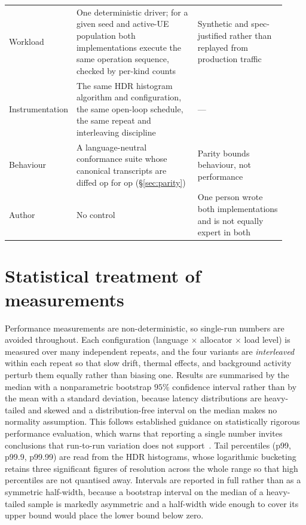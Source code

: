 \documentclass[english,twoside,openright,a4paper,censored,csm,software-track-2020]{HYthesisML}
\begin{document}
\begin{table}
\begin{tabular}{@{}R{0.16\linewidth} R{0.44\linewidth} R{0.32\linewidth}@{}}
Workload & One deterministic driver; for a given seed and active-UE population both implementations execute the same operation sequence, checked by per-kind counts & Synthetic and spec-justified rather than replayed from production traffic \\
Instrumentation & The same HDR histogram algorithm and configuration, the same open-loop schedule, the same repeat and interleaving discipline & --- \\
Behaviour & A language-neutral conformance suite whose canonical transcripts are diffed op for op (\S\ref{sec:parity}) & Parity bounds behaviour, not performance \\
\hline
Author & No control & One person wrote both implementations and is not equally expert in both \\
\hline
\end{tabular}
\end{table}

\section{Statistical treatment of measurements}\label{sec:stats}
Performance measurements are non-deterministic, so single-run numbers are avoided throughout.
Each configuration (language $\times$ allocator $\times$ load level) is measured over many
independent repeats, and the four variants are \emph{interleaved} within each repeat so that
slow drift, thermal effects, and background activity perturb them equally rather than biasing
one. Results are summarised by the median with a nonparametric bootstrap $95\%$ confidence
interval rather than by the mean with a standard deviation, because latency distributions are
heavy-tailed and skewed and a distribution-free interval on the median makes no normality
assumption. This follows established guidance on statistically rigorous performance evaluation,
which warns that reporting a single number invites conclusions that run-to-run variation does
not support~\cite{georges2007rigorous}. Tail percentiles (p99, p99.9, p99.99) are read from the
HDR histograms, whose logarithmic bucketing retains three significant figures of resolution
across the whole range so that high percentiles are not quantised away. Intervals are reported
in full rather than as a symmetric half-width, because a bootstrap interval on the median of a
heavy-tailed sample is markedly asymmetric and a half-width wide enough to cover its upper
bound would place the lower bound below zero.
\end{document}
